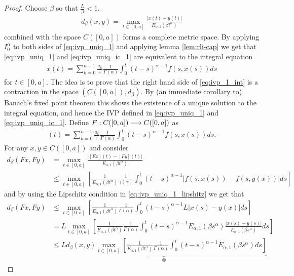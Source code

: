 \begin{proof}
	Choose $ \beta $ so that $ \frac{L}{\beta} < 1 $.
	\begin{align*}
		d_\beta(x,y) = \max_{t \in [0,a]} \frac{|x(t) - y(t)|}{E_{\alpha,1}(\beta t^\alpha)}
	\end{align*}
	combined with the space $ C([0,a]) $ forms a complete metric space. By applying $ I_0^\alpha $ to both sides of \eqref{eq:ivp_uniq_1} and applying lemma \ref{lem:rli-cap} we get that \eqref{eq:ivp_uniq_1} and \eqref{eq:ivp_uniq_ic_1} are equivalent to the integral equation
	\begin{align}
		\label{eq:ivp_1_int}
		x(t) = \sum_{k=0}^{n-1} \frac{a_k} + \frac{1}{\Gamma(\alpha)} \int_0^t (t-s)^{\alpha-1}f(s,x(s))ds
	\end{align}
	for $ t \in [0,a] $.
	The idea is to prove that the right hand side of \eqref{eq:ivp_1_int} is a contraction in the space $ (C([0,a]),d_\beta) $. By (an immediate corollary to) Banach's fixed point theorem this shows the existence of a unique solution to the integral equation, and hence the IVP defined in \eqref{eq:ivp_uniq_1} and \eqref{eq:ivp_uniq_ic_1}.
	Define $ F : C([0,a]) \longrightarrow C([0,a]) $
	as
	\begin{align*}
		[Fx](t) = \sum_{k=0}^{n-1} \frac{a_k} + \frac{1}{\Gamma(\alpha)} \int_0^t (t-s)^{\alpha-1}f(s,x(s))ds.
	\end{align*}
	For any $ x, y \in C([0,a]) $ and consider
	\begin{align*}
		d_\beta(Fx,Fy) &= \max_{t\in[0,a]} \frac{|[Fx](t) - [Fy](t)|}{E_{\alpha,1}(\beta t^\alpha)} \\
			&\leq \max_{t\in[0,a]} \left[ \frac{1}{E_{\alpha,1}(\beta t^\alpha)} \frac{1}{\gamma(\alpha)} \int_0^t (t-s)^{\alpha-1}| f(s,x(s)) - f(s,y(x))|ds  \right]
	\end{align*}
	and by using the Lipschitz condition in \eqref{eq:ivp_uniq_1_lipshitz} we get that
	\begin{align*}
		d_\beta(Fx,Fy) &\leq \max_{t\in[0,a]} \left[ \frac{1}{E_{\alpha,1}(\beta t^\alpha)} \frac{1}{\Gamma(\alpha)} \int_0^t (t-s)^{\alpha-1}L| x(s) - y(x)|ds  \right] \\
		&= L  \max_{t\in[0,a]} \left[ \frac{1}{E_{\alpha,1}(\beta t^\alpha)} \frac{1}{\Gamma(\alpha)} \int_0^t (t-s)^{\alpha - 1} E_{\alpha,1}(\beta s^\alpha) \frac{|x(s) - y(s)|}{E_{\alpha,1}(\beta s^\alpha)} ds \right] \\
		&\leq \underbrace{L d_\beta(x,y) \max_{t\in [0,a]} \left[ \frac{1}{E_{\alpha,1}(\beta t^\alpha)}\frac{1}{\Gamma(\alpha)} \int_0^t (t-s)^{\alpha-1} E_{\alpha,1}(\beta s^\alpha) ds\right]}_{\circledast}

\end{align*}
\end{proof}
